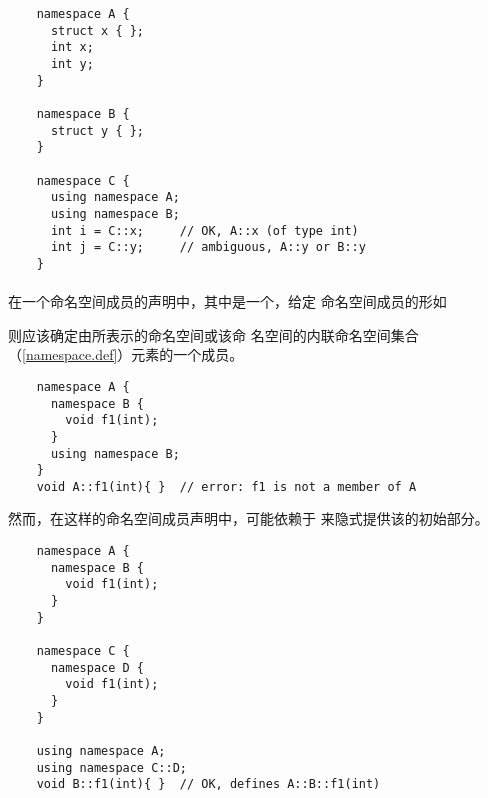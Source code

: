 \begin{example}
  \begin{lstlisting}
    namespace A {
      struct x { };
      int x;
      int y;
    }

    namespace B {
      struct y { };
    }

    namespace C {
      using namespace A;
      using namespace B;
      int i = C::x;     // OK, A::x (of type int)
      int j = C::y;     // ambiguous, A::y or B::y
    }
  \end{lstlisting}
\end{example}

\paragraph{} %
在一个命名空间成员的声明中，其中是一个，给定
命名空间成员的形如\par
\qquad{}\par
则应该确定由所表示的命名空间或该命
名空间的内联命名空间集合（\ref{namespace.def}）元素的一个成员。

\begin{example}
  \begin{lstlisting}
    namespace A {
      namespace B {
        void f1(int);
      }
      using namespace B;
    }
    void A::f1(int){ }  // error: f1 is not a member of A
  \end{lstlisting}
\end{example}

然而，在这样的命名空间成员声明中，可能依赖于
来隐式提供该的初始部分。

\begin{example}
  \begin{lstlisting}
    namespace A {
      namespace B {
        void f1(int);
      }
    }

    namespace C {
      namespace D {
        void f1(int);
      }
    }

    using namespace A;
    using namespace C::D;
    void B::f1(int){ }  // OK, defines A::B::f1(int)
  \end{lstlisting}
\end{example}
